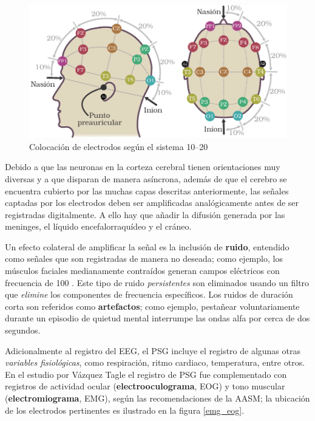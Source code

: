 \begin{figure}
\centering
\includegraphics[width=\linewidth]{./img_diagramas/cabeza_proporcionada_color_v2.pdf} 
\caption{Colocación de electrodos según el sistema 10--20}
\label{img1020}
\end{figure}

Debido a que las neuronas en la corteza cerebral tienen orientaciones muy diversas y a que disparan 
de manera asíncrona, además de que el cerebro se encuentra cubierto por las muchas capas descritas
anteriormente, las señales captadas por los electrodos deben ser amplificadas analógicamente antes 
de ser registradas digitalmente.
%
A ello hay que añadir la difusión generada por las meninges, el líquido encefalorraquídeo y el 
cráneo.

Un efecto colateral de amplificar la señal es la inclusión de \textbf{ruido}, entendido como 
señales que son registradas de manera no deseada; como ejemplo, los músculos faciales medianamente 
contraídos generan campos eléctricos con frecuencia de 100 \hz.
%
Este tipo de ruido \textit{persistentes} son eliminados usando un filtro que \textit{elimine} los 
componentes de frecuencia específicos.
%
Los ruidos de duración corta son referidos como \textbf{artefactos}; como ejemplo, pestañear 
voluntariamente durante un episodio de quietud mental interrumpe las ondas alfa por cerca de dos 
segundos. 

Adicionalmente al registro del EEG, el PSG incluye el registro de algunas otras \textit{variables 
fisiológicas}, como respiración, ritmo cardiaco, temperatura, entre otros. 
%
En el estudio por Vázquez Tagle el registro de PSG fue complementado con registros de actividad 
ocular (\textbf{electrooculograma}, EOG) y tono muscular (\textbf{electromiograma}, EMG), según las 
recomendaciones de la AASM; la ubicación de los electrodos pertinentes es ilustrado en la figura 
\ref{emg_eog}.

